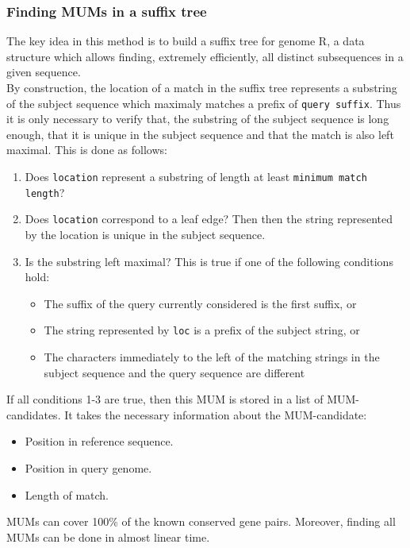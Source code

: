 \documentclass[3p,times]{elsarticle}
\begin{document}
\subsubsection{Finding MUMs in a suffix tree} 
The key idea in this method is to build a suffix tree for genome R, a data structure which allows finding, extremely efficiently, all distinct subsequences in a given sequence.\\
  By construction, the location of a match in the suffix tree represents a substring of the subject sequence which maximaly matches a prefix of
  \texttt{query suffix}. Thus it is only necessary to verify that, the substring of the subject sequence is long enough, that it is unique in the subject sequence and that 
  the match is also left maximal. This is done as follows:
  
  \begin{enumerate}
  \item
  Does \texttt{location} represent a substring of length at least \texttt{minimum match length}?
  \item 
  Does \texttt{location} correspond to a leaf edge? Then then the string represented by the location is unique in the subject sequence.
  \item 
  Is the substring left maximal? This is true if one of the following conditions hold:
  \begin{itemize}
  \item 
  The suffix of the query currently considered is the first suffix, or 
  \item
  The string represented by \texttt{loc} is a prefix of the subject string,  or
  \item 
  The characters immediately to the left of the matching strings in the subject sequence and the query sequence are different
  \end{itemize}
  \end{enumerate}
  If all conditions 1-3 are true, then this MUM is stored in a list of MUM-candidates. It takes the necessary information about the MUM-candidate:
  \begin{itemize}
    \item Position in reference sequence.
    \item Position in query genome.
    \item Length of match.
  \end{itemize}
MUMs can cover 100\% of the known conserved gene pairs. Moreover, finding all MUMs can be done in almost linear time.
\end{document}
